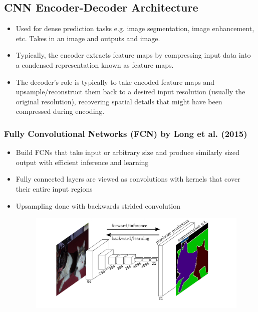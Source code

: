 \subsection{CNN Encoder-Decoder Architecture}
\begin{itemize}
    \item Used for dense prediction tasks e.g. image segmentation, image enhancement, etc. Takes in an image and outputs and image.
    \item Typically, the encoder extracts feature maps by compressing input data into a condensed representation known as feature maps.
    \item The decoder's role is typically to take encoded feature maps and upsample/reconstruct them back to a desired input resolution (usually the original resolution), recovering spatial details that might have been compressed during encoding.
\end{itemize}

\subsubsection{Fully Convolutional Networks (FCN) by Long et al. (2015)}
\begin{itemize}
    \item Build FCNs that take input or arbitrary size and produce similarly sized output with efficient inference and learning
    \item Fully connected layers are viewed as convolutions with kernels that cover their entire input regions
    \item Upsampling done with backwards strided convolution

    \begin{figure}[H]
        \centering
        \includegraphics[width=0.75\linewidth]{img/FCN.png}
        
        
    \end{figure}
    
\end{itemize}

